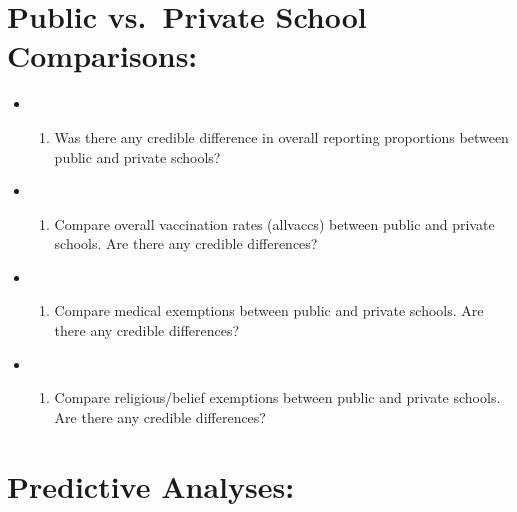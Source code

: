 \documentclass[]{article}
\providecommand{\tightlist}{%
  \setlength{\itemsep}{0pt}\setlength{\parskip}{0pt}}
\begin{document}
\hypertarget{public-vs.private-school-comparisons}{%
\section{Public vs.~Private School
Comparisons:}\label{public-vs.private-school-comparisons}}

\begin{itemize}
\item
  \begin{enumerate}
  \def\labelenumi{\arabic{enumi}.}
  \setcounter{enumi}{4}
  \tightlist
  \item
    Was there any credible difference in overall reporting proportions
    between public and private schools?
  \end{enumerate}
\item
  \begin{enumerate}
  \def\labelenumi{\arabic{enumi}.}
  \setcounter{enumi}{5}
  \tightlist
  \item
    Compare overall vaccination rates (allvaccs) between public and
    private schools. Are there any credible differences?
  \end{enumerate}
\item
  \begin{enumerate}
  \def\labelenumi{\arabic{enumi}.}
  \setcounter{enumi}{6}
  \tightlist
  \item
    Compare medical exemptions between public and private schools. Are
    there any credible differences?
  \end{enumerate}
\item
  \begin{enumerate}
  \def\labelenumi{\arabic{enumi}.}
  \setcounter{enumi}{7}
  \tightlist
  \item
    Compare religious/belief exemptions between public and private
    schools. Are there any credible differences?
  \end{enumerate}
\end{itemize}

\hypertarget{predictive-analyses}{%
\section{Predictive Analyses:}\label{predictive-analyses}}
\end{document}

